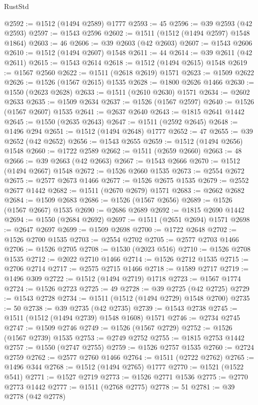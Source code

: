 \begin{lexlean}{RustStd}
\begin{coremodule}
{\begin{coremodule}
{{{{{{{{{{{{{{{{{{{{{{{{{{{{{{{{{{{@2592 := @1512 (@1494 @2589) @1777
@2593 := 45
@2596 := @39 @2593 (@42 @2593)
@2597 := @1543 @2596
@2602 := @1511 (@1512 (@1494 @2597) @1548 @1864)
@2603 := 46
@2606 := @39 @2603 (@42 @2603)
@2607 := @1543 @2606
@2610 := @1512 (@1494 @2607) @1548
@2611 := 44
@2614 := @39 @2611 (@42 @2611)
@2615 := @1543 @2614
@2618 := @1512 (@1494 @2615) @1548
@2619 := @1567 @2560
@2622 := @1511 (@2618 @2619) @1571
@2623 := @1509 @2622
@2626 := @1526 (@1567 @2615) @1535
@2628 := @1800 @2626 @1466
@2630 := @1550 (@2623 @2628)
@2633 := @1511 (@2610 @2630) @1571
@2634 := @2602 @2633
@2635 := @1509 @2634
@2637 := @1526 (@1567 @2597)
@2640 := @1526 (@1567 @2607) @1535
@2641 := @2637 @2640
@2643 := @1815 @2641 @1442
@2645 := @1550 (@2635 @2643)
@2647 := @1511 (@2592 @2645)
@2648 := @1496 @294
@2651 := @1512 (@1494 @2648) @1777
@2652 := 47
@2655 := @39 @2652 (@42 @2652)
@2656 := @1543 @2655
@2659 := @1512 (@1494 @2656) @1548
@2660 := @1722 @2589
@2662 := @1511 (@2659 @2660)
@2663 := 48
@2666 := @39 @2663 (@42 @2663)
@2667 := @1543 @2666
@2670 := @1512 (@1494 @2667) @1548
@2672 := @1526 @2660 @1535
@2673 := @2554 @2672
@2675 := @2577 @2673 @1466
@2677 := @1526 @2675 @1535
@2679 := @2552 @2677 @1442
@2682 := @1511 (@2670 @2679) @1571
@2683 := @2662 @2682
@2684 := @1509 @2683
@2686 := @1526 (@1567 @2656)
@2689 := @1526 (@1567 @2667) @1535
@2690 := @2686 @2689
@2692 := @1815 @2690 @1442
@2694 := @1550 (@2684 @2692)
@2697 := @1511 (@2651 @2694) @1571
@2698 := @2647 @2697
@2699 := @1509 @2698
@2700 := @1722 @2648
@2702 := @1526 @2700 @1535
@2703 := @2554 @2702
@2705 := @2577 @2703 @1466
@2706 := @1526 @2705
@2708 := @1530 (@2023 @516)
@2710 := @1526 @2708 @1535
@2712 := @2022 @2710 @1466
@2714 := @1526 @2712 @1535
@2715 := @2706 @2714
@2717 := @2575 @2715 @1466
@2718 := @1589 @2717
@2719 := @1496 @309
@2722 := @1512 (@1494 @2719) @1718
@2723 := @1567 @1774
@2724 := @1526 @2723
@2725 := 49
@2728 := @39 @2725 (@42 @2725)
@2729 := @1543 @2728
@2734 := @1511 (@1512 (@1494 @2729) @1548 @2700)
@2735 := 50
@2738 := @39 @2735 (@42 @2735)
@2739 := @1543 @2738
@2745 := @1511 (@1512 (@1494 @2739) @1548 @1608) @1571
@2746 := @2734 @2745
@2747 := @1509 @2746
@2749 := @1526 (@1567 @2729)
@2752 := @1526 (@1567 @2739) @1535
@2753 := @2749 @2752
@2755 := @1815 @2753 @1442
@2757 := @1550 (@2747 @2755)
@2759 := @1526 @2757 @1535
@2760 := @2724 @2759
@2762 := @2577 @2760 @1466
@2764 := @1511 (@2722 @2762)
@2765 := @1496 @344
@2768 := @1512 (@1494 @2765) @1777
@2770 := @1521 (@1522 @541)
@2771 := @1527 @2719
@2773 := @1526 @2771 @1536
@2775 := @2770 @2773 @1442
@2777 := @1511 (@2768 @2775)
@2778 := 51
@2781 := @39 @2778 (@42 @2778)
}}}}}}}}}}}}}}}}}}}}}}}}}}}}}}}}}}}
\end{coremodule}}
\end{coremodule}
\end{lexlean}
